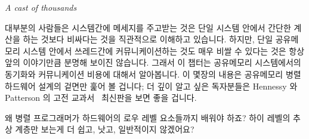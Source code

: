 
%
	 {\emph{A cast of thousands}}

대부분의 사람들은 시스템간에 메세지를 주고받는 것은 단일 시스템 안에서 간단한
계산을 하는 것보다 비싸다는 것을 직관적으로 이해하고 있습니다.
하지만, 단일 공유메모리 시스템 안에서 쓰레드간에 커뮤니케이션하는 것도 매우
비쌀 수 있다는 것은 항상 앞의 이야기만큼 분명해 보이진 않습니다.
그래서 이 챕터는 공유메모리 시스템에서의 동기화와 커뮤니케이션 비용에 대해서
알아봅니다.
이 몇장의 내용은 공유메모리 병렬 하드웨어 설계의 겉면만 훑어 볼 겁니다; 더 깊이
알고 싶은 독자분들은 Hennessy 와 Patterson 의 고전 교과서~\cite{Hennessy95a}
최신판을 보면 좋을 겁니다.
\iffalse

Most people have an intuitive understanding that passing messages between
systems is considerably more expensive than performing simple calculations
within the confines of a single system.
However, it is not always so clear that communicating among threads within
the confines of a single shared-memory system can also be quite expensive.
This chapter therefore looks at the cost of synchronization and communication
within a shared-memory system.
These few pages can do no more than scratch the surface of shared-memory
parallel hardware design; readers desiring more detail would do well
to start with a recent edition of Hennessy and Patterson's classic
text~\cite{Hennessy2011,Hennessy95a}.
\fi

\QuickQuiz{}
	왜 병렬 프로그래머가 하드웨어의 로우 레벨 요소들까지 배워야 하죠?
	하이 레벨의 추상 계층만 보는게 더 쉽고, 낫고, 일반적이지 않겠어요?
	\iffalse

